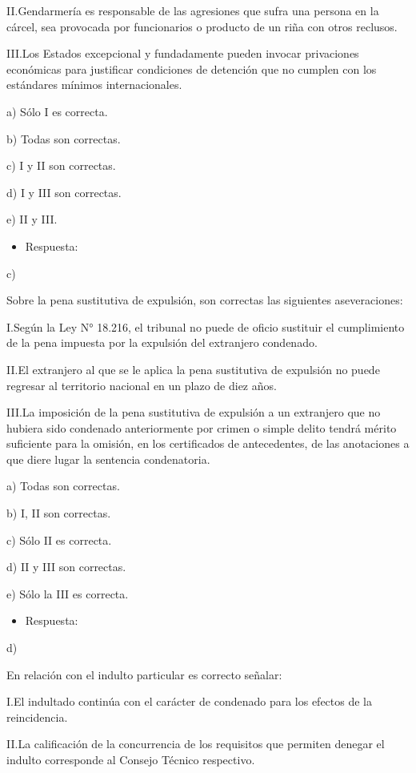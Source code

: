 \documentclass[letterpaper, 11pt]{article}
\begin{document}
II.Gendarmería es responsable de las agresiones que sufra una persona en la cárcel,
sea provocada por funcionarios o producto de un riña con otros reclusos.

III.Los Estados excepcional y fundadamente pueden invocar privaciones económicas
para justificar condiciones de detención que no cumplen con los estándares
mínimos internacionales.

a) Sólo I es correcta.

b) Todas son correctas.

c) I y II son correctas.

d) I y III son correctas.

e) II y III.

\begin{itemize}
\item Respuesta:
\end{itemize}
c)


Sobre la pena sustitutiva de expulsión, son correctas las siguientes aseveraciones:

I.Según la Ley N° 18.216, el tribunal no puede de oficio sustituir el cumplimiento de
la pena impuesta por la expulsión del extranjero condenado.

II.El extranjero al que se le aplica la pena sustitutiva de expulsión no puede regresar
al territorio nacional en un plazo de diez años.

III.La imposición de la pena sustitutiva de expulsión a un extranjero que no hubiera
sido condenado anteriormente por crimen o simple delito tendrá mérito suficiente
para la omisión, en los certificados de antecedentes, de las anotaciones a que
diere lugar la sentencia condenatoria.


a) Todas son correctas.

b) I, II son correctas.

c) Sólo II es correcta.

d) II y III son correctas.

e) Sólo la III es correcta.

\begin{itemize}
\item Respuesta:
\end{itemize}
d)


En relación con el indulto particular es correcto señalar:

I.El indultado continúa con el carácter de condenado para los efectos de la
reincidencia.

II.La calificación de la concurrencia de los requisitos que permiten denegar el indulto
corresponde al Consejo Técnico respectivo.
\end{document}
